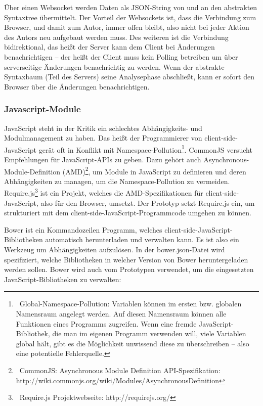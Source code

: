  
Über einen Websocket werden Daten als JSON-String von und an den abstrakten Syntaxtree übermittelt. Der Vorteil der Websockets ist, dass die Verbindung zum Browser, und damit zum Autor, immer offen bleibt, also nicht bei jeder Aktion des Autors neu aufgebaut werden muss. Des weiteren ist die Verbindung bidirektional, das heißt der Server kann dem Client bei Änderungen benachrichtigen -- der heißt der Client muss kein Polling betreiben um über serverseitige Änderungen benachrichtig zu werden. Wenn der abstrakte Syntaxbaum (Teil des Servers) seine Analysephase abschließt, kann er sofort den Browser über die Änderungen benachrichtigen.

 
\subsubsection{Javascript-Module}\label{}

 
JavaScript steht in der Kritik ein schlechtes Abhängigkeits- und Modulmanagement zu haben. Das heißt der Programmierer von client-side-JavaScript gerät oft in Konflikt mit Namespace-Pollution\footnote{~Global-Namespace-Pollution: Variablen können im ersten bzw. globalen Namensraum angelegt werden. Auf diesen Namensraum können alle Funktionen eines Programms zugreifen. Wenn eine fremde JavaScript-Bibliothek, die man im eigenen Programm verwenden will, viele Variablen global hält, gibt es die Möglichkeit unwissend diese zu überschreiben -- also eine potentielle Fehlerquelle.}. CommonJS versucht Empfehlungen für JavaScript-APIs zu geben. Dazu gehört auch Asynchronous-Module-Definition (AMD)\footnote{~CommonJS: Asynchronous Module Definition API-Spezifikation: http://wiki.commonjs.org/wiki/Modules/AsynchronousDefinition}, um Module in JavaScript zu definieren und deren Abhängigkeiten zu managen, um die Namespace-Pollution zu vermeiden. Require.js\footnote{~Require.js Projektwebseite: http://requirejs.org/} ist ein Projekt, welches die AMD-Spezifikationen für client-side-JavaScript, also für den Browser, umsetzt. Der Prototyp setzt Require.js ein, um strukturiert mit dem client-side-JavaScript-Programmcode umgehen zu können.

 
Bower ist ein Kommandozeilen Programm, welches client-side-JavaScript-Bibliotheken automatisch herunterladen und verwalten kann. Es ist also ein Werkzeug um Abhängigkeiten aufzulösen. In der bower.json-Datei wird spezifiziert, welche Bibliotheken in welcher Version von Bower heruntergeladen werden sollen. Bower wird auch vom Prototypen verwendet, um die eingesetzten JavaScript-Bibliotheken zu verwalten:

